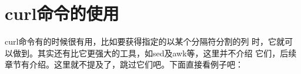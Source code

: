 \section{curl命令的使用}
\label{sec:curlCmd}

curl命令有的时候很有用，比如要获得指定的以某个分隔符分割的列
时，它就可以做到。其实还有比它更强大的工具，如sed及awk等，这里并不介绍
它们，后续章节有介绍。这里就不提及了，跳过它们吧。下面直接看例子吧：

